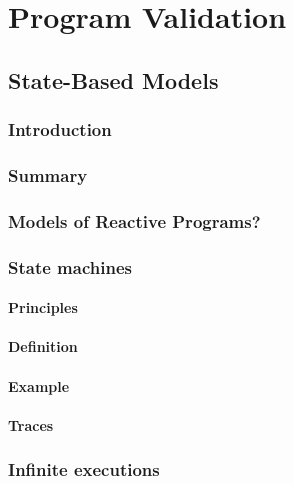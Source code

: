 \documentclass[12pt, a4paper]{book}
\begin{document}
  \chapter{Program Validation}
  \label{chap:Program Validation}

  \section{State-Based Models}
  \label{sec:State-Based Models}
  \subsection{Introduction}
  \label{sub:Introduction}
  \subsection{Summary}
  \label{sub:Summary}
  \subsection{Models of Reactive Programs?}
  \label{sub:Models of Reactive Programs?}
  \subsection{State machines}
  \label{sub:State machines}
  \subsubsection{Principles}
  \label{subs:Principles}
  \subsubsection{Definition}
  \label{subs:Definition}
  \subsubsection{Example}
  \label{subs:Example}
  \subsubsection{Traces}
  \label{subs:Traces}
  \subsection{Infinite executions}
  \label{sub:Infinite executions}
\end{document}
